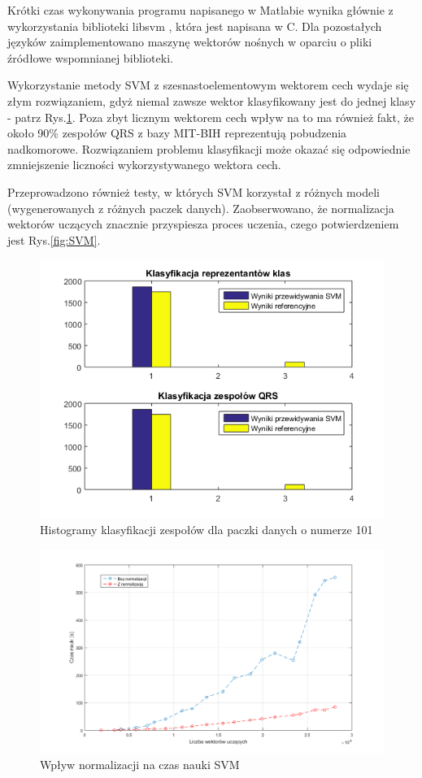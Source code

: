 Krótki czas wykonywania programu napisanego w Matlabie wynika głównie z wykorzystania biblioteki libsvm \cite{csie}, która jest napisana w C. Dla pozostałych języków zaimplementowano maszynę wektorów nośnych w oparciu o pliki źródłowe wspomnianej biblioteki.

Wykorzystanie metody SVM z szesnastoelementowym wektorem cech wydaje się złym rozwiązaniem, gdyż niemal zawsze wektor klasyfikowany jest do jednej klasy - patrz Rys.\ref{fig:hist1}. Poza zbyt licznym wektorem cech wpływ na to ma również fakt, że około 90\% zespołów QRS z bazy MIT-BIH reprezentują pobudzenia nadkomorowe. Rozwiązaniem problemu klasyfikacji może okazać się odpowiednie zmniejszenie liczności wykorzystywanego wektora cech.

Przeprowadzono również testy, w których SVM korzystał z różnych modeli (wygenerowanych z różnych paczek danych). Zaobserwowano, że normalizacja wektorów uczących znacznie przyspiesza proces uczenia, czego potwierdzeniem jest Rys.\ref{fig:SVM}.

\begin{figure}[!htp]
	\centering
	\includegraphics[width=15cm]{Grafika/101_2_3}
	\caption{Histogramy klasyfikacji zespołów dla paczki danych o numerze 101}
	\label{fig:hist1}
\end{figure}

\begin{figure}[!htp]
	\centering
	\includegraphics[width=16cm]{Grafika/SVMTrain}
	\caption{Wpływ normalizacji na czas nauki SVM}
	\label{fig:TrainNormSVM}
\end{figure}

